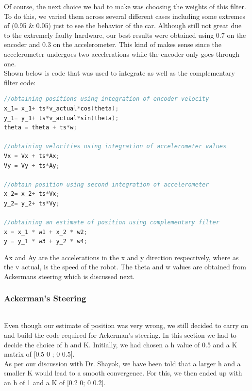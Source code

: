 \documentclass[conference]{IEEEtran}
\begin{document}
    Of course, the next choice we had to make was choosing the weights of this filter.
    To do this, we varied them across several different cases including some extremes
    of (0.95 \& 0.05) just to see the behavior of the car. Although still not great due
    to the extremely faulty hardware, our best results were obtained using 0.7 on the
    encoder and 0.3 on the accelerometer. This kind of makes sense since the
    accelerometer undergoes two accelerations while the encoder only goes through one.\\

    Shown below is code that was used to integrate as well as the complementary filter code:

\begin{lstlisting}[language=C++, caption=Integration Code and Complementary Filter Code]
//obtaining positions using integration of encoder velocity 
x_1= x_1+ ts*v_actual*cos(theta);
y_1= y_1+ ts*v_actual*sin(theta);
theta = theta + ts*w;

//obtaining velocities using integration of accelerometer values
Vx = Vx + ts*Ax;
Vy = Vy + ts*Ay;

//obtain position using second integration of accelerometer
x_2= x_2+ ts*Vx;
y_2= y_2+ ts*Vy;

//obtaining an estimate of position using complementary filter  
x = x_1 * w1 + x_2 * w2;
y = y_1 * w3 + y_2 * w4;\end{lstlisting}

    Ax and Ay are the accelerations in the x and y direction respectively, where as the v actual,
    is the speed of the robot. The theta and w values are obtained from Ackermans steering which
    is discussed next.\\

    \subsubsection{Ackerman’s Steering}

    ~~\\Even though our estimate of position was very wrong, we still decided to carry
    on and build the code required for Ackerman’s steering. In this section we had
    to decide the choice of h and K. Initially, we had chosen a h value of 0.5 and
    a K matrix of [0.5 0 ; 0 0.5].\\

    As per our discussion with Dr. Shayok, we have been told that a larger h and a
    smaller K would lead to a smooth convergence. For this, we then ended up with
    an h of 1 and a K of [0.2 0; 0 0.2].\\
    
\end{document}
